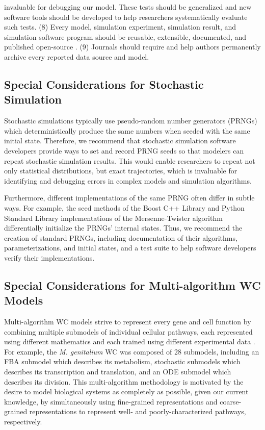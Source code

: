 \documentclass[journal,transmag,twoside]{IEEEtran}
\begin{document}
invaluable for debugging our model. These tests should be generalized and new software tools should be developed to help researchers systematically evaluate such tests. (8) Every model, simulation experiment, simulation result, and simulation software program should be reusable, extensible, documented, and published open-source \cite{easterbrook2014open}. (9) Journals should require and help authors permanently archive every reported data source and model.

\subsection{Special Considerations for Stochastic Simulation}
Stochastic simulations typically use pseudo-random number generators (PRNGs) which deterministically produce the same numbers when seeded with the same initial state. Therefore, we recommend that stochastic simulation software developers provide ways to set and record PRNG seeds so that modelers can repeat stochastic simulation results. This would enable researchers to repeat not only statistical distributions, but exact trajectories, which is invaluable for identifying and debugging errors in complex models and simulation algorithms.

Furthermore, different implementations of the same PRNG often differ in subtle ways. For example, the seed methods of the Boost C++ Library \cite{schaling2011boost} and Python Standard Library implementations of the Mersenne-Twister algorithm differentially initialize the PRNGs' internal states. Thus, we recommend the creation of standard PRNGs, including documentation of their algorithms, parameterizations, and initial states, and a test suite to help software developers verify their implementations.
 
\subsection{Special Considerations for Multi-algorithm WC Models}
Multi-algorithm WC models strive to represent every gene and cell function by combining multiple submodels of individual cellular pathways, each represented using different mathematics and each trained using different experimental data \cite{Karr2015, macklin2014future, carrera2015build}. For example, the \textit{M. genitalium} WC was composed of 28 submodels, including an FBA submodel which describes its metabolism, stochastic submodels which describes its transcription and translation, and an ODE submodel which describes its division. This multi-algorithm methodology is motivated by the desire to model biological systems as completely as possible, given our current knowledge, by simultaneously using fine-grained representations and coarse-grained representations to represent well- and poorly-characterized pathways, respectively.
\end{document}
